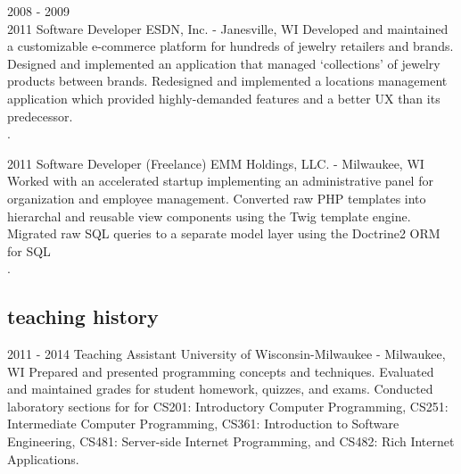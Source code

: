 \documentclass[]{fritz-resume}
\begin{document}
\begin{entrylist}
  \entry
    {2008 - 2009 \\ 2011}
    {Software Developer}
    {ESDN, Inc. - Janesville, WI}
    {
      Developed and maintained a customizable e-commerce platform for hundreds of jewelry retailers and brands. Designed and implemented an application that managed `collections' of jewelry products between brands. Redesigned and implemented a locations management application which provided highly-demanded features and a better UX than its predecessor. \\ .
    }

  \entry
    {2011}
    {Software Developer (Freelance)}
    {EMM Holdings, LLC. - Milwaukee, WI}
    {
      Worked with an accelerated startup implementing an administrative panel for organization and employee management. Converted raw PHP templates into hierarchal and reusable view components using the Twig template engine. Migrated raw SQL queries to a separate model layer using the Doctrine2 ORM for SQL \\ .
    }
\end{entrylist}

\subsection{teaching history}

\begin{entrylist}
  \entry
    {2011 - 2014}
    {Teaching Assistant}
    {University of Wisconsin-Milwaukee - Milwaukee, WI}
    {
      Prepared and presented programming concepts and techniques. Evaluated and maintained grades for student homework, quizzes, and exams. Conducted laboratory sections for for CS201: Introductory Computer Programming, CS251: Intermediate Computer Programming, CS361: Introduction to Software Engineering, CS481: Server-side Internet Programming, and CS482: Rich Internet Applications.
    }
\end{entrylist}
\end{document}
